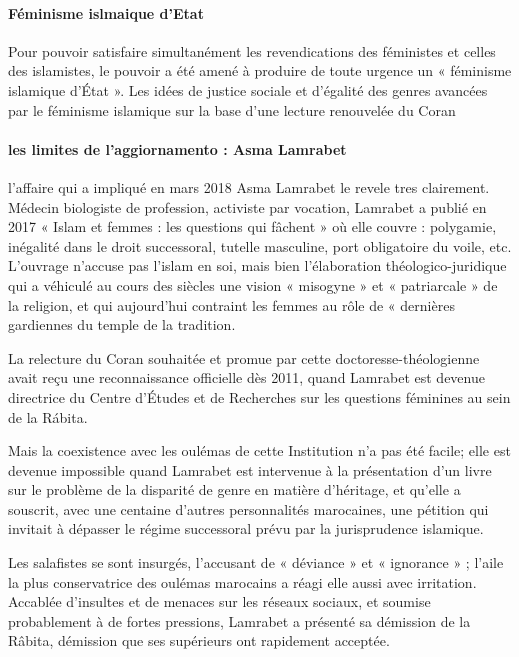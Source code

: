 \paragraph{Féminisme islmaique d'Etat}Pour pouvoir satisfaire simultanément les revendications des féministes et celles des islamistes, le pouvoir a été amené à produire de toute urgence un « féminisme islamique d'État ».
Les idées de justice sociale et d'égalité des genres avancées par le féminisme islamique sur la base d'une lecture renouvelée du Coran
\paragraph{les limites de l'aggiornamento : Asma Lamrabet}
l'affaire qui a impliqué en mars 2018 Asma Lamrabet le revele tres clairement. Médecin biologiste de profession, activiste par vocation, Lamrabet a publié en 2017  « Islam et femmes : les questions qui fâchent »   où elle couvre : polygamie, inégalité dans le droit successoral, tutelle masculine, port obligatoire du voile, etc.
L'ouvrage n'accuse pas l'islam en soi, mais bien l'élaboration théologico-juridique qui a véhiculé au cours des siècles une vision « misogyne » et « patriarcale » de la religion, et qui aujourd'hui contraint les femmes au rôle de « dernières gardiennes du temple de la tradition.

  La relecture du Coran souhaitée et promue par cette 
  doctoresse-théologienne avait reçu
une
reconnaissance officielle dès 2011, quand Lamrabet est devenue directrice du Centre d'Études et de Recherches sur les questions féminines au sein de la Rábita.

 Mais la coexistence avec les oulémas de cette Institution n'a pas été facile; elle est devenue impossible quand Lamrabet est intervenue à la présentation d'un livre sur le problème de la disparité de genre en matière d'héritage, et qu'elle a souscrit, avec une centaine d'autres personnalités marocaines, une pétition qui invitait à dépasser le régime successoral prévu par la jurisprudence islamique.

  Les salafistes se sont insurgés, l'accusant de « déviance » et « ignorance » ; l'aile la plus conservatrice des oulémas marocains a réagi elle aussi avec irritation.
  Accablée d'insultes et de menaces sur les réseaux sociaux, et soumise probablement à de fortes pressions, Lamrabet a présenté sa démission de la Râbita, démission que ses supérieurs ont rapidement acceptée.
